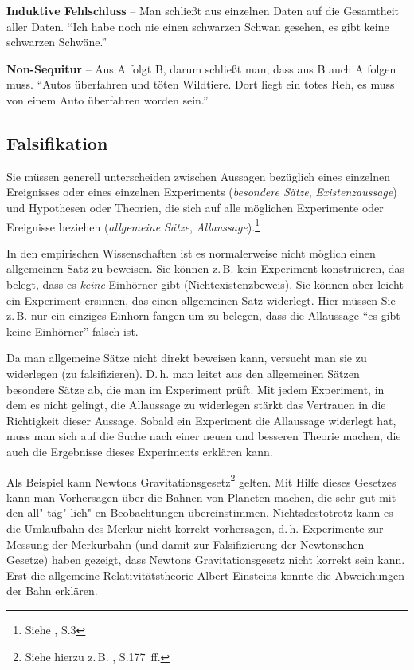 \documentclass[a4paper,11pt,headings=normal]{scrartcl}
\begin{document}
\vspace{0.3cm}\noindent\textbf{Induktive Fehlschluss} -- Man schließt aus einzelnen Daten auf die Gesamtheit aller Daten. "`Ich habe noch nie einen schwarzen Schwan gesehen, es gibt keine schwarzen Schwäne."'

\vspace{0.3cm}\noindent\textbf{Non-Sequitur} -- Aus A folgt B, darum schließt man, dass aus B auch A folgen muss. "`Autos überfahren und töten Wildtiere. Dort liegt ein totes Reh, es muss von einem Auto überfahren worden sein."'

\subsection{Falsifikation}

Sie müssen generell unterscheiden zwischen Aussagen bezüglich eines einzelnen Ereignisses oder eines einzelnen Experiments (\textit{besondere Sätze}, \textit{Existenzaussage}) und Hypothesen oder Theorien, die sich auf alle möglichen Experimente oder Ereignisse beziehen (\textit{allgemeine Sätze}, \textit{Allaussage}).\footnote{Siehe \autocite{Popper1969}, S.3}

In den empirischen Wissenschaften ist es normalerweise nicht möglich einen allgemeinen Satz zu beweisen. Sie können z.\,B. kein Experiment konstruieren, das belegt, dass es \textit{keine} Einhörner gibt (Nichtexistenzbeweis). Sie können aber leicht ein Experiment ersinnen, das einen allgemeinen Satz widerlegt. Hier müssen Sie z.\,B. nur ein einziges Einhorn fangen um zu belegen, dass die Allaussage "`es gibt keine Einhörner"' falsch ist.

Da man allgemeine Sätze nicht direkt beweisen kann, versucht man sie zu widerlegen (zu falsifizieren). D.\,h. man leitet aus den allgemeinen Sätzen besondere Sätze ab, die man im Experiment prüft. Mit jedem Experiment, in dem es nicht gelingt, die Allaussage zu widerlegen stärkt das Vertrauen in die Richtigkeit dieser Aussage. Sobald ein Experiment die Allaussage widerlegt hat, muss man sich auf die Suche nach einer neuen und besseren Theorie machen, die auch die Ergebnisse dieses Experiments erklären kann.

Als Beispiel kann Newtons Gravitationsgesetz\footnote{Siehe hierzu z.\,B. \autocite{Giancoli2010}, S.177~ff.} gelten. Mit Hilfe dieses Gesetzes kann man Vorhersagen über die Bahnen von Planeten machen, die sehr gut mit den all"-täg"-lich"-en Beobachtungen übereinstimmen. Nichtsdestotrotz kann es die Umlaufbahn des Merkur nicht korrekt vorhersagen, d.\,h. Experimente zur Messung der Merkurbahn (und damit zur Falsifizierung der Newtonschen Gesetze) haben gezeigt, dass Newtons Gravitationsgesetz nicht korrekt sein kann. Erst die allgemeine Relativitätstheorie Albert Einsteins konnte die Abweichungen der Bahn erklären.
\end{document}
